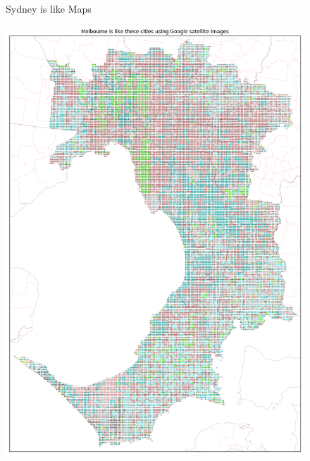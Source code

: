 \documentclass[sageh,times]{sagej}
\begin{document}
\begin{figure}[!htbp]
\caption{Sydney is like Maps}    
 \label{fig:sydmaps}  
\end{figure} 


\begin{figure}[!htbp]
\centering    
\includegraphics[scale=0.25]{Images/MelbourneOverall_sat.png} 

\end{figure}
\end{document}
